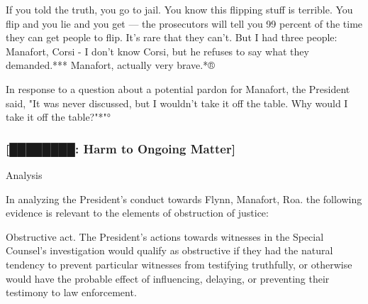 If you told the truth, you go to jail.
You know this flipping stuff is terrible.
You flip and you lie and you get — the prosecutors will tell you 99 percent of the time they can get people to flip.
It's rare that they can't.
But I had three people: Manafort, Corsi - I don't know Corsi, but he refuses to say what they demanded.***
Manafort, actually very brave.*®

In response to a question about a potential pardon for Manafort, the President said, "It was never discussed, but I wouldn't take it off the table.
Why would I take it off the table?"*"°

\subsubsection{[████████: Harm to Ongoing Matter]}








Analysis

In analyzing the President's conduct towards Flynn, Manafort, Roa.
the following evidence is relevant to the elements of obstruction of justice:

Obstructive act.
The President's actions towards witnesses in the Special Counsel's investigation would qualify as obstructive if they had the natural tendency to prevent particular witnesses from testifying truthfully, or otherwise would have the probable effect of influencing, delaying, or preventing their testimony to law enforcement.

